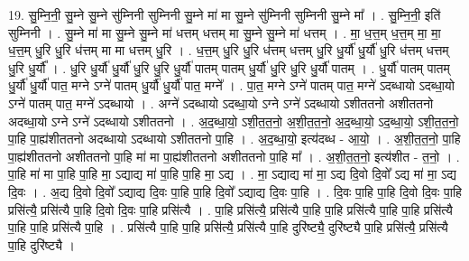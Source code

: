 \documentclass[17pt]{extarticle}
\begin{document}
19. सु॒म्नि॒नी॒ सु॒म्ने सु॒म्ने सु॑म्निनी सुम्निनी सु॒म्ने मा॑ मा सु॒म्ने सु॑म्निनी सुम्निनी सु॒म्ने मा᳚ । . सु॒म्नि॒नी॒ इति॑ सुम्निनी । . सु॒म्ने मा॑ मा सु॒म्ने सु॒म्ने मा॑ धत्तम् धत्तम् मा सु॒म्ने सु॒म्ने मा॑ धत्तम् । . मा॒ ध॒त्त॒म् ध॒त्त॒म् मा॒ मा॒ ध॒त्त॒म् धु॒रि धु॒रि ध॑त्तम् मा मा धत्तम् धु॒रि । . ध॒त्त॒म् धु॒रि धु॒रि ध॑त्तम् धत्तम् धु॒रि धु॒र्यौ॑ धु॒र्यौ॑ धु॒रि ध॑त्तम् धत्तम् धु॒रि धु॒र्यौ᳚ । . धु॒रि धु॒र्यौ॑ धु॒र्यौ॑ धु॒रि धु॒रि धु॒र्यौ॑ पातम् पातम् धु॒र्यौ॑ धु॒रि धु॒रि धु॒र्यौ॑ पातम् । . धु॒र्यौ॑ पातम् पातम् धु॒र्यौ॑ धु॒र्यौ॑ पात॒ मग्ने ऽग्ने॑ पातम् धु॒र्यौ॑ धु॒र्यौ॑ पात॒ मग्ने᳚ । . पा॒त॒ मग्ने ऽग्ने॑ पातम् पात॒ मग्ने॑ ऽदब्धायो ऽदब्धा॒यो ऽग्ने॑ पातम् पात॒ मग्ने॑ ऽदब्धायो । . अग्ने॑ ऽदब्धायो ऽदब्धा॒यो ऽग्ने ऽग्ने॑ ऽदब्धायो ऽशीततनो अशीततनो अदब्धा॒यो ऽग्ने ऽग्ने॑ ऽदब्धायो ऽशीततनो । . अ॒द॒ब्धा॒यो॒ ऽशी॒त॒त॒नो॒ अ॒शी॒त॒त॒नो॒ अ॒द॒ब्धा॒यो॒ ऽद॒ब्धा॒यो॒ ऽशी॒त॒त॒नो॒ पा॒हि पा॒ह्य॑शीततनो अदब्धायो ऽदब्धायो ऽशीततनो पा॒हि । . अ॒द॒ब्धा॒यो॒ इत्य॑दब्ध - आ॒यो॒ । . अ॒शी॒त॒त॒नो॒ पा॒हि पा॒ह्य॑शीततनो अशीततनो पा॒हि मा॑ मा पा॒ह्य॑शीततनो अशीततनो पा॒हि मा᳚ । . अ॒शी॒त॒त॒नो॒ इत्य॑शीत - त॒नो॒ । . पा॒हि मा॑ मा पा॒हि पा॒हि मा॒ ऽद्याद्य मा॑ पा॒हि पा॒हि मा॒ ऽद्य । . मा॒ ऽद्याद्य मा॑ मा॒ ऽद्य दि॒वो दि॒वो᳚ ऽद्य मा॑ मा॒ ऽद्य दि॒वः । . अ॒द्य दि॒वो दि॒वो᳚ ऽद्याद्य दि॒वः पा॒हि पा॒हि दि॒वो᳚ ऽद्याद्य दि॒वः पा॒हि । . दि॒वः पा॒हि पा॒हि दि॒वो दि॒वः पा॒हि प्रसि॑त्यै॒ प्रसि॑त्यै पा॒हि दि॒वो दि॒वः पा॒हि प्रसि॑त्यै । . पा॒हि प्रसि॑त्यै॒ प्रसि॑त्यै पा॒हि पा॒हि प्रसि॑त्यै पा॒हि पा॒हि प्रसि॑त्यै पा॒हि पा॒हि प्रसि॑त्यै पा॒हि । . प्रसि॑त्यै पा॒हि पा॒हि प्रसि॑त्यै॒ प्रसि॑त्यै पा॒हि दुरि॑ष्ट्यै॒ दुरि॑ष्ट्यै पा॒हि प्रसि॑त्यै॒ प्रसि॑त्यै पा॒हि दुरि॑ष्ट्यै । \newline
\end{document}
